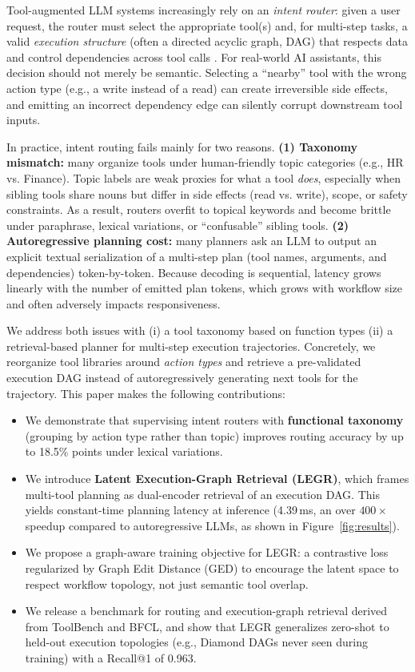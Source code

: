 \documentclass{article}
\begin{document}
Tool-augmented LLM systems increasingly rely on an \emph{intent router}: given a user request, the router must select the appropriate tool(s) and, for multi-step tasks, a valid \emph{execution structure} (often a directed acyclic graph, DAG) that respects data and control dependencies across tool calls \cite{mialon2023augmented,shen2023hugginggpt,song2023restgpt}. For real-world AI assistants, this decision should not merely  be semantic. Selecting a ``nearby'' tool with the wrong action type (e.g., a write instead of a read) can create irreversible side effects, and emitting an incorrect dependency edge can silently corrupt downstream tool inputs.

In practice, intent routing  fails mainly for two reasons. \textbf{(1) Taxonomy mismatch:} many organize tools under human-friendly topic categories (e.g., HR vs. Finance). Topic labels are weak proxies for what a tool \emph{does}, especially when sibling tools share nouns but differ in side effects (read vs. write), scope, or safety constraints. As a result, routers overfit to topical keywords and become brittle under paraphrase, lexical variations, or ``confusable'' sibling tools. \textbf{(2) Autoregressive planning cost:} many planners ask an LLM to output an explicit textual serialization of a multi-step plan (tool names, arguments, and dependencies) token-by-token. Because decoding is sequential, latency grows linearly with the number of emitted plan tokens, which grows with workflow size and often adversely impacts responsiveness.

We address both issues with (i) a tool taxonomy based on function types (ii) a retrieval-based planner for multi-step execution trajectories. Concretely, we reorganize tool libraries around \emph{action types} and retrieve a pre-validated execution DAG instead of autoregressively generating next tools for the trajectory. This paper makes the following contributions:
\begin{itemize}
    \item We demonstrate that supervising intent routers with  \textbf{functional taxonomy} (grouping by action type rather than topic) improves routing accuracy by up to 18.5\% points under lexical variations.
    \item We introduce \textbf{Latent Execution-Graph Retrieval (LEGR)}, which frames multi-tool planning as dual-encoder retrieval of an execution DAG. This yields constant-time planning latency at inference (4.39\,ms, an over $400\times$ speedup compared to autoregressive LLMs, as shown in Figure~\ref{fig:results}).
    \item We propose a graph-aware training objective for LEGR: a contrastive loss regularized by Graph Edit Distance (GED) to encourage the latent space to respect workflow topology, not just semantic tool overlap.
    \item We release a benchmark for routing and execution-graph retrieval derived from ToolBench and BFCL, and show that LEGR generalizes zero-shot to held-out execution topologies (e.g., Diamond DAGs never seen during training) with a Recall@1 of 0.963.
\end{itemize}
\end{document}
